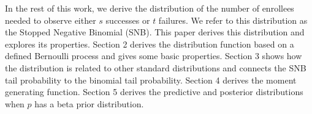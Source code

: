 \documentclass[review]{elsarticle}
\begin{document}

In the rest of this work, we derive the distribution of the number of 
enrollees needed
to observe either $s$ successes or $t$ failures. We refer to this distribution
as the Stopped Negative Binomial (SNB). 
This paper derives this distribution and explores its properties.
Section 2 derives the distribution function
based on a defined Bernoulli process and gives some basic properties.
Section 3 shows how the distribution is related to other standard
distributions and connects the SNB tail probability to the binomial tail 
probability.
Section 4 derives the moment generating function.
Section 5 derives the predictive and posterior distributions when $p$ has a 
beta prior distribution.
\end{document}
